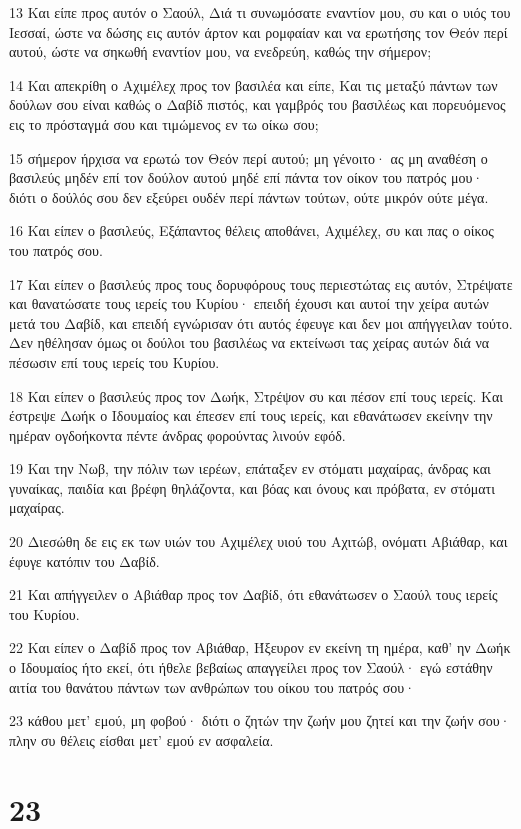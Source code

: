 \par 13 Και είπε προς αυτόν ο Σαούλ, Διά τι συνωμόσατε εναντίον μου, συ και ο υιός του Ιεσσαί, ώστε να δώσης εις αυτόν άρτον και ρομφαίαν και να ερωτήσης τον Θεόν περί αυτού, ώστε να σηκωθή εναντίον μου, να ενεδρεύη, καθώς την σήμερον;
\par 14 Και απεκρίθη ο Αχιμέλεχ προς τον βασιλέα και είπε, Και τις μεταξύ πάντων των δούλων σου είναι καθώς ο Δαβίδ πιστός, και γαμβρός του βασιλέως και πορευόμενος εις το πρόσταγμά σου και τιμώμενος εν τω οίκω σου;
\par 15 σήμερον ήρχισα να ερωτώ τον Θεόν περί αυτού; μη γένοιτο· ας μη αναθέση ο βασιλεύς μηδέν επί τον δούλον αυτού μηδέ επί πάντα τον οίκον του πατρός μου· διότι ο δούλός σου δεν εξεύρει ουδέν περί πάντων τούτων, ούτε μικρόν ούτε μέγα.
\par 16 Και είπεν ο βασιλεύς, Εξάπαντος θέλεις αποθάνει, Αχιμέλεχ, συ και πας ο οίκος του πατρός σου.
\par 17 Και είπεν ο βασιλεύς προς τους δορυφόρους τους περιεστώτας εις αυτόν, Στρέψατε και θανατώσατε τους ιερείς του Κυρίου· επειδή έχουσι και αυτοί την χείρα αυτών μετά του Δαβίδ, και επειδή εγνώρισαν ότι αυτός έφευγε και δεν μοι απήγγειλαν τούτο. Δεν ηθέλησαν όμως οι δούλοι του βασιλέως να εκτείνωσι τας χείρας αυτών διά να πέσωσιν επί τους ιερείς του Κυρίου.
\par 18 Και είπεν ο βασιλεύς προς τον Δωήκ, Στρέψον συ και πέσον επί τους ιερείς. Και έστρεψε Δωήκ ο Ιδουμαίος και έπεσεν επί τους ιερείς, και εθανάτωσεν εκείνην την ημέραν ογδοήκοντα πέντε άνδρας φορούντας λινούν εφόδ.
\par 19 Και την Νωβ, την πόλιν των ιερέων, επάταξεν εν στόματι μαχαίρας, άνδρας και γυναίκας, παιδία και βρέφη θηλάζοντα, και βόας και όνους και πρόβατα, εν στόματι μαχαίρας.
\par 20 Διεσώθη δε εις εκ των υιών του Αχιμέλεχ υιού του Αχιτώβ, ονόματι Αβιάθαρ, και έφυγε κατόπιν του Δαβίδ.
\par 21 Και απήγγειλεν ο Αβιάθαρ προς τον Δαβίδ, ότι εθανάτωσεν ο Σαούλ τους ιερείς του Κυρίου.
\par 22 Και είπεν ο Δαβίδ προς τον Αβιάθαρ, Ήξευρον εν εκείνη τη ημέρα, καθ' ην Δωήκ ο Ιδουμαίος ήτο εκεί, ότι ήθελε βεβαίως απαγγείλει προς τον Σαούλ· εγώ εστάθην αιτία του θανάτου πάντων των ανθρώπων του οίκου του πατρός σου·
\par 23 κάθου μετ' εμού, μη φοβού· διότι ο ζητών την ζωήν μου ζητεί και την ζωήν σου· πλην συ θέλεις είσθαι μετ' εμού εν ασφαλεία.

\chapter{23}

